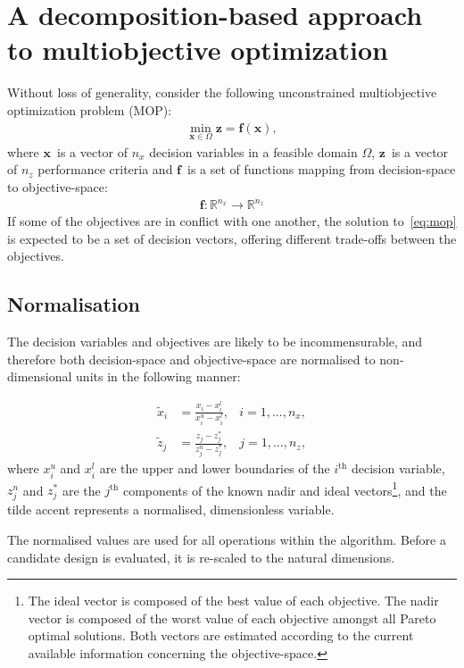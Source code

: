 \documentclass[10pt]{llncs}
\newcommand{\brr}[1]{{\left({#1}\right)}} %
\newcommand{\vx}{\ensuremath{\mathbf{x}}} %
\newcommand{\vf}{\ensuremath{\mathbf{f}}} %
\newcommand{\vz}{\ensuremath{\mathbf{z}}} %
\begin{document}
\section{A decomposition-based approach to multiobjective optimization}
\label{sec:Decomposition}
Without loss of generality, consider the following unconstrained multiobjective optimization problem (MOP):
\begin{align}
\label{eq:mop}
	\min_{\vx\in\Omega} \vz=\vf\brr{\vx},
\end{align}
where \vx\ is a vector of $n_x$ decision variables in a feasible domain $\Omega$, \vz\ is a vector of $n_z$ performance criteria and \vf\ is a set of functions mapping from decision-space to objective-space:
\begin{align}
	\vf: \mathbb{R}^{n_x} \rightarrow \mathbb{R}^{n_z}
\end{align}
If some of the objectives are in conflict with one another, the solution to~\eqref{eq:mop} is expected to be a set of decision vectors, offering different trade-offs between the objectives.

\subsection{Normalisation} 
\label{subsec:Normalisation}
The decision variables and objectives are likely to be incommensurable, and therefore both decision-space and objective-space are normalised to non-dimensional units in the following manner:

\begin{align}
	\tilde{x}_i &= \frac{x_i - x^l_i}{x^u_i - x^l_i} , &i=1,\ldots,n_x,\\
	\tilde{z}_j &= \frac{z_j - z^*_j}{z^n_j - z^*_j} , &j=1,\ldots,n_z,
\end{align}
where $x^u_i$ and $x^l_i$ are the upper and lower boundaries of the $i^\text{th}$ decision variable, $z^n_j$ and $z^*_j$ are the $j^\text{th}$ components of the known nadir and ideal vectors\footnote{The ideal vector is composed of the best value of each objective. The nadir vector is composed of the worst value of each objective amongst all Pareto optimal solutions. Both vectors are estimated according to the current available information concerning the objective-space.}, and the tilde accent represents a normalised, dimensionless variable.

The normalised values are used for all operations within the algorithm. Before a candidate design is evaluated, it is re-scaled to the natural dimensions.
\end{document}
